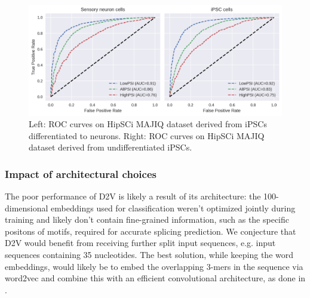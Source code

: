 \begin{figure}
	\centering\includegraphics[width=1\textwidth]{../visualizations/ch5-results/majiq_neuron_ipsc_cross_psi_roc_auc_comparison.png} 
	\caption{Left: ROC curves on HipSCi MAJIQ dataset derived from iPSCs differentiated to neurons. Right: ROC curves on HipSCi MAJIQ dataset derived from undifferentiated iPSCs. }
	\label{fig:majiq_rocs_low_high}
\end{figure}




\subsubsection{Impact of architectural choices} \label{subsubsec:majiq_architectural_choices}
The poor performance of D2V is likely a result of its architecture: the 100-dimensional embeddings used for classification weren't optimized jointly during training and likely don't contain fine-grained information, such as the specific positons of motifs, required for accurate splicing prediction. We conjecture that D2V would benefit from receiving further split input sequences, e.g. input sequences containing 35 nucleotides. The best solution, while keeping the word embeddings, would likely be to embed the overlapping 3-mers in the sequence via word2vec and combine this with an efficient convolutional architecture, as done in \cite{d2vsplicing}.



